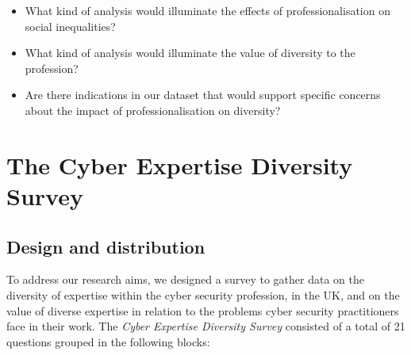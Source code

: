\documentclass[
  a4paper,
]{book}
\begin{document}
\begin{itemize}
\item
  What kind of analysis would illuminate the effects of
  professionalisation on social inequalities?
\item
  What kind of analysis would illuminate the value of diversity to the
  profession?
\item
  Are there indications in our dataset that would support specific
  concerns about the impact of professionalisation on diversity?
\end{itemize}


\chapter{The Cyber Expertise Diversity
Survey}\label{the-cyber-expertise-diversity-survey}

\section{Design and distribution}\label{design-and-distribution}

To address our research aims, we designed a survey to gather data on the
diversity of expertise within the cyber security profession, in the UK,
and on the value of diverse expertise in relation to the problems cyber
security practitioners face in their work. The \emph{Cyber Expertise
Diversity Survey} consisted of a total of 21 questions grouped in the
following blocks:
\end{document}
